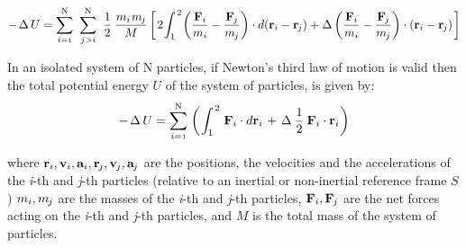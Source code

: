 \documentclass[10pt]{article}
\newcommand{\mM}{m}
\newcommand{\mU}{U}
\newcommand{\ri}{_i}
\newcommand{\vR}{\mathbf{r}}
\newcommand{\vV}{\mathbf{v}}
\newcommand{\vA}{\mathbf{a}}
\newcommand{\vF}{\mathbf{F}}
\newcommand{\rj}{_{\hspace{-0.081em}j}}
\begin{document}
\begin{eqnarray*}
- \hspace{+0.12em} \Delta \hspace{+0.18em} \mU = \sum_{i={\scriptscriptstyle 1}}^{\mathrm N} \hspace{+0.36em} \sum_{j>i}^{\mathrm N} \hspace{+0.36em} \frac{1}{2} \hspace{+0.24em} \frac{\mM\ri\hspace{+0.09em}\mM\rj}{M} \left[ \hspace{+0.12em} 2 \hspace{-0.12em} \int_1^{\hspace{+0.09em} 2} \hspace{-0.12em} \left(\frac{\vF\ri}{\mM\ri} - \frac{\vF\rj}{\mM\rj}\right) \cdot d(\vR\ri - \vR\rj) + \hspace{+0.03em} \Delta \left(\frac{\vF\ri}{\mM\ri} - \frac{\vF\rj}{\mM\rj}\right) \cdot (\vR\ri - \vR\rj) \hspace{+0.12em} \right]
\end{eqnarray*}
\medskip
\par In an isolated system of N particles, if Newton's third law of motion is valid then the total potential energy $\mU$ of the system of particles, is given by:
\vspace{+0.75em}
\begin{eqnarray*}
- \hspace{+0.12em} \Delta \hspace{+0.18em} \mU = \sum_{i={\scriptscriptstyle 1}}^{\mathrm N} \hspace{+0.12em} \left( \hspace{+0.06em} \int_1^{\hspace{+0.09em} 2} \hspace{+0.12em} \vF\ri \cdot d\vR\ri \hspace{+0.12em} + \hspace{+0.12em} \Delta \hspace{+0.24em} \frac{1}{2} \hspace{+0.24em} \vF\ri \cdot \vR\ri \hspace{+0.06em} \right)
\end{eqnarray*}
\medskip
\par \noindent where $\vR\ri, \vV\ri, \vA\ri, \vR\rj, \vV\rj, \vA\rj$ are the positions, the velocities and the accelerations of the \textit{i}-th and \textit{j}-th particles (relative to an inertial or non-inertial reference frame $S$) $\mM\ri, \mM\rj$ are the masses of the \textit{i}-th and \textit{j}-th particles, $\vF\ri, \vF\rj$ are the net forces acting on the \textit{i}-th and \textit{j}-th particles, and $M$ is the total mass of the system of particles.
\end{document}

